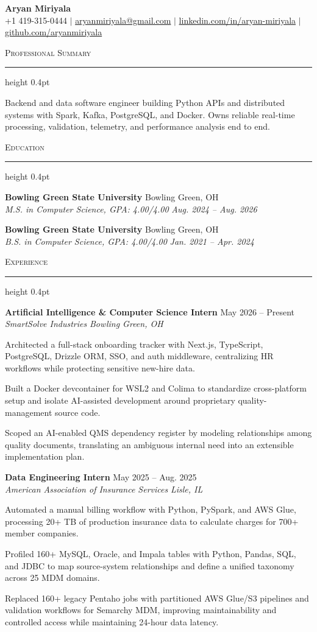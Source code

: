 \documentclass[letterpaper,11pt]{article}
\newcommand{\resumesection}[1]{%
  \par\vspace{2pt}%
  {\large\scshape #1}\par\vspace{2pt}%
  \hrule height 0.4pt\vspace{2pt}%
}
\newcommand{\resumeSubheading}[4]{
  \textbf{#1} \hfill #2\\
  \textit{#3} \hfill \textit{#4}
}
\begin{document}
\begin{center}
  {\LARGE \textbf{Aryan Miriyala}}\\[-1pt]
  \small
  +1 419-315-0444 $|$
  \href{mailto:aryanmiriyala@gmail.com}{aryanmiriyala@gmail.com} $|$
  \href{https://www.linkedin.com/in/aryan-miriyala-7788a21b6/}{linkedin.com/in/aryan-miriyala} $|$
  \href{https://github.com/aryanmiriyala}{github.com/aryanmiriyala}
\end{center}\vspace{-10pt}

\resumesection{Professional Summary}
Backend and data software engineer building Python APIs and distributed systems with Spark, Kafka, PostgreSQL, and Docker. Owns reliable real-time processing, validation, telemetry, and performance analysis end to end.

\resumesection{Education}
\resumeSubheading
{Bowling Green State University}{Bowling Green, OH}
{M.S. in Computer Science, GPA: 4.00/4.00}{Aug. 2024 -- Aug. 2026}

\resumeSubheading
{Bowling Green State University}{Bowling Green, OH}
{B.S. in Computer Science, GPA: 4.00/4.00}{Jan. 2021 -- Apr. 2024}

\resumesection{Experience}
\resumeSubheading
{Artificial Intelligence \& Computer Science Intern}{May 2026 -- Present}
{SmartSolve Industries}{Bowling Green, OH}
\begin{tightitemize}
  \item Architected a full-stack onboarding tracker with Next.js, TypeScript, PostgreSQL, Drizzle ORM, SSO, and auth middleware, centralizing HR workflows while protecting sensitive new-hire data.
  \item Built a Docker devcontainer for WSL2 and Colima to standardize cross-platform setup and isolate AI-assisted development around proprietary quality-management source code.
  \item Scoped an AI-enabled QMS dependency register by modeling relationships among quality documents, translating an ambiguous internal need into an extensible implementation plan.
\end{tightitemize}

\resumeSubheading
{Data Engineering Intern}{May 2025 -- Aug. 2025}
{American Association of Insurance Services}{Lisle, IL}
\begin{tightitemize}
  \item Automated a manual billing workflow with Python, PySpark, and AWS Glue, processing 20+ TB of production insurance data to calculate charges for 700+ member companies.
  \item Profiled 160+ MySQL, Oracle, and Impala tables with Python, Pandas, SQL, and JDBC to map source-system relationships and define a unified taxonomy across 25 MDM domains.
  \item Replaced 160+ legacy Pentaho jobs with partitioned AWS Glue/S3 pipelines and validation workflows for Semarchy MDM, improving maintainability and controlled access while maintaining 24-hour data latency.
\end{tightitemize}
\end{document}
